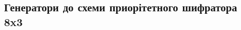 \documentclass{article}
\begin{document}
\begin{normalsize}
	\section*{Генератори до схеми приорітетного шифратора 8x3}
	\begin{figure}[H]
		\centering
		\hspace{5px}
		

\end{figure}
\end{normalsize}
\end{document}
